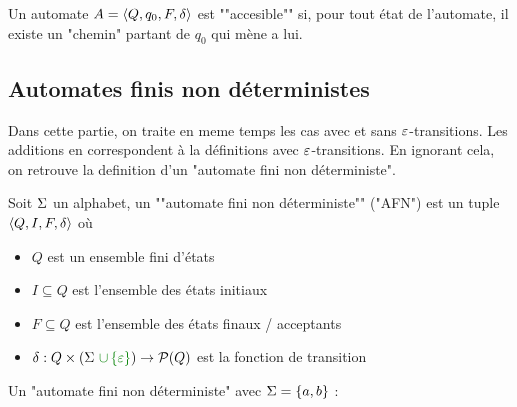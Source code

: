 \begin{definition}
	\AP
	Un automate $A = \langle Q, q_0, F, \delta \rangle$ est ""accesible"" si, pour tout état de l'automate, il existe un "chemin" partant de
	$q_0$ qui mène a lui.
\end{definition}

\subsection{Automates finis non déterministes }

Dans cette partie, on traite en meme temps les cas avec et sans $\varepsilon$-transitions. Les additions en
 correspondent à la définitions avec $\varepsilon$-transitions. En ignorant cela, on retrouve la
definition d'un "automate fini non déterministe".

\begin{definition}
	\AP
	Soit $\Sigma$ un alphabet, un ""automate fini non déterministe"" ("AFN") est un tuple $\langle Q, I, F, \delta \rangle$ où
	\begin{itemize}
		\item $Q$ est un ensemble fini d'états
		\item $I \subseteq Q$ est l'ensemble des états initiaux
		\item $F \subseteq Q$ est l'ensemble des états finaux / acceptants
		\item $\delta : Q \times (\alphabet \darkgreen {\ \cup \set\motvide}) \to \mathcal{P}(Q)$ est la fonction de transition
	\end{itemize}
\end{definition}


\begin{exemple}
	Un "automate fini non déterministe" avec $\Sigma = \left\{a, b\right\}$ :
	\begin{center}
		\begin{automata}

		\end{automata}
	\end{center}
\end{exemple}



